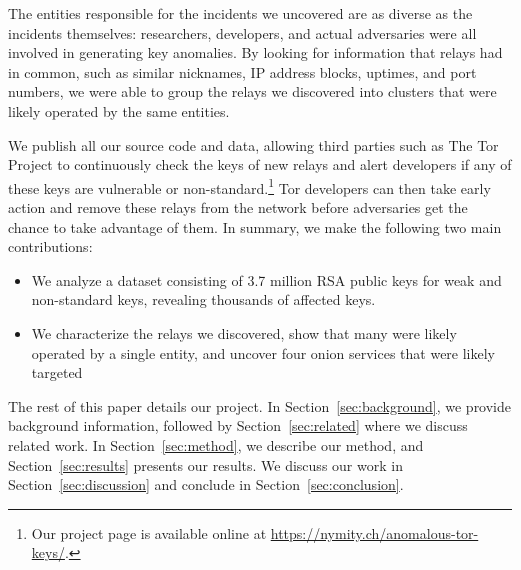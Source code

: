 The entities responsible for the incidents we uncovered 
are as diverse as the incidents themselves: 
researchers, developers, and actual
adversaries were all involved in generating key anomalies.  
By looking for information that relays had in common, such as similar nicknames, 
IP address blocks, uptimes, and port numbers, 
we were able to group the relays we discovered into clusters 
that were likely operated by the same entities.

We publish all our source code and data, allowing third parties such as The Tor
Project to continuously check the keys of new relays and alert developers if
any of these keys are vulnerable or non-standard.\footnote{Our project page is
available online at \url{https://nymity.ch/anomalous-tor-keys/}.}  Tor
developers can then take early action and remove these relays from the network
before adversaries get the chance to take advantage of them.  In summary, we
make the following two main contributions:
\begin{itemize}
	\item We analyze a dataset consisting of 3.7 million RSA public keys for
		weak and non-standard keys, revealing thousands of affected keys.

	\item We characterize the relays we discovered, show that many were
		likely operated by a single entity, and uncover four onion services that
		were likely targeted
\end{itemize}

The rest of this paper details our project.  In Section~\ref{sec:background}, we
provide background information, followed by Section~\ref{sec:related} where we 
discuss related work.  In Section~\ref{sec:method}, we describe our method,
and Section~\ref{sec:results} presents our results.  We discuss our work in
Section~\ref{sec:discussion} and conclude in Section~\ref{sec:conclusion}.
